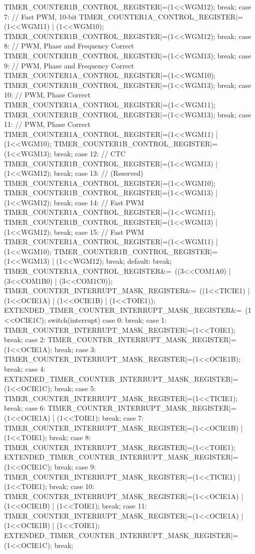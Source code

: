 \begin{verbatimtab}
{{		TIMER_COUNTER1B_CONTROL_REGISTER|=(1<<WGM12);
		break;
		case 7:	// Fast PWM, 10-bit
		TIMER_COUNTER1A_CONTROL_REGISTER|=(1<<WGM11) | (1<<WGM10);
		TIMER_COUNTER1B_CONTROL_REGISTER|=(1<<WGM12);
		break;
		case 8:	// PWM, Phase and Frequency Correct
		TIMER_COUNTER1B_CONTROL_REGISTER|=(1<<WGM13);
		break;
		case 9:	// PWM, Phase and Frequency Correct
		TIMER_COUNTER1A_CONTROL_REGISTER|=(1<<WGM10);
		TIMER_COUNTER1B_CONTROL_REGISTER|=(1<<WGM13);
		break;
		case 10: // PWM, Phase Correct
		TIMER_COUNTER1A_CONTROL_REGISTER|=(1<<WGM11);
		TIMER_COUNTER1B_CONTROL_REGISTER|=(1<<WGM13);
		break;
		case 11: // PWM, Phase Correct
		TIMER_COUNTER1A_CONTROL_REGISTER|=(1<<WGM11) | (1<<WGM10);
		TIMER_COUNTER1B_CONTROL_REGISTER|=(1<<WGM13);
		break;
		case 12: // CTC
		TIMER_COUNTER1B_CONTROL_REGISTER|=(1<<WGM13) | (1<<WGM12);
		break;
		case 13: // (Reserved)
		TIMER_COUNTER1A_CONTROL_REGISTER|=(1<<WGM10);
		TIMER_COUNTER1B_CONTROL_REGISTER|=(1<<WGM13) | (1<<WGM12);
		break;
		case 14: // Fast PWM
		TIMER_COUNTER1A_CONTROL_REGISTER|=(1<<WGM11);
		TIMER_COUNTER1B_CONTROL_REGISTER|=(1<<WGM13) | (1<<WGM12);
		break;
		case 15: // Fast PWM
		TIMER_COUNTER1A_CONTROL_REGISTER|=(1<<WGM11) | (1<<WGM10);
		TIMER_COUNTER1B_CONTROL_REGISTER|=(1<<WGM13) | (1<<WGM12);
		break;
		default:
		break;
	}
	TIMER_COUNTER1A_CONTROL_REGISTER&=~((3<<COM1A0) | (3<<COM1B0) |
	(3<<COM1C0));
	TIMER_COUNTER_INTERRUPT_MASK_REGISTER&=~((1<<TICIE1) | (1<<OCIE1A) |
	(1<<OCIE1B) | (1<<TOIE1));
	EXTENDED_TIMER_COUNTER_INTERRUPT_MASK_REGISTER&=~(1<<OCIE1C);
	switch(interrupt){
		case 0:
		break;
		case 1:
		TIMER_COUNTER_INTERRUPT_MASK_REGISTER|=(1<<TOIE1);
		break;
		case 2:
		TIMER_COUNTER_INTERRUPT_MASK_REGISTER|=(1<<OCIE1A);
		break;
		case 3:
		TIMER_COUNTER_INTERRUPT_MASK_REGISTER|=(1<<OCIE1B);
		break;
		case 4:
		EXTENDED_TIMER_COUNTER_INTERRUPT_MASK_REGISTER|=(1<<OCIE1C);
		break;
		case 5:
		TIMER_COUNTER_INTERRUPT_MASK_REGISTER|=(1<<TICIE1);
		break;
		case 6:
		TIMER_COUNTER_INTERRUPT_MASK_REGISTER|=(1<<OCIE1A) | (1<<TOIE1);
		break;
		case 7:
		TIMER_COUNTER_INTERRUPT_MASK_REGISTER|=(1<<OCIE1B) | (1<<TOIE1);
		break;
		case 8:
		TIMER_COUNTER_INTERRUPT_MASK_REGISTER|=(1<<TOIE1);
		EXTENDED_TIMER_COUNTER_INTERRUPT_MASK_REGISTER|=(1<<OCIE1C);
		break;
		case 9:
		TIMER_COUNTER_INTERRUPT_MASK_REGISTER|=(1<<TICIE1) | (1<<TOIE1);
		break;
		case 10:
		TIMER_COUNTER_INTERRUPT_MASK_REGISTER|=(1<<OCIE1A) | (1<<OCIE1B) | (1<<TOIE1);
		break;
		case 11:
		TIMER_COUNTER_INTERRUPT_MASK_REGISTER|=(1<<OCIE1A) | (1<<OCIE1B) | (1<<TOIE1);
		EXTENDED_TIMER_COUNTER_INTERRUPT_MASK_REGISTER|=(1<<OCIE1C);
		break;
}}
\end{verbatimtab}
